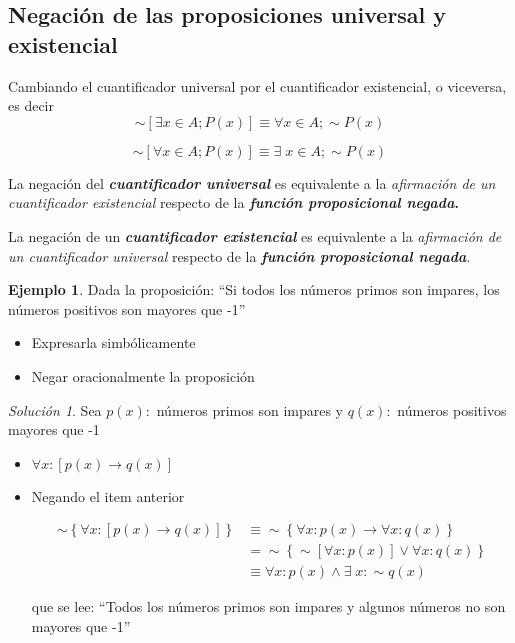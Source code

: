 \documentclass[
  16pt,
]{krantz}
\providecommand{\tightlist}{%
  \setlength{\itemsep}{0pt}\setlength{\parskip}{0pt}}
\theoremstyle{definition}
\theoremstyle{definition}
\newtheorem{example}{Ejemplo}[chapter]
\theoremstyle{definition}
\theoremstyle{definition}
\theoremstyle{remark}
\newtheorem*{solution}{Solución}
\begin{document}
\hypertarget{negaciuxf3n-de-las-proposiciones-universal-y-existencial}{%
\subsection{Negación de las proposiciones universal y existencial}\label{negaciuxf3n-de-las-proposiciones-universal-y-existencial}}

Cambiando el cuantificador universal por el cuantificador existencial, o viceversa, es decir \[\sim[\exists x\in A; P(x)]\equiv\forall x\in A;\sim P(x)\]

\[
\sim\left[\forall  x\in A; P(x)\right]\equiv\exists\; x\in A;\sim P(x)
\]

La negación del \textbf{\emph{cuantificador universal}} es equivalente a la \emph{afirmación de un cuantificador existencial} respecto de la \textbf{\emph{función proposicional negada}.}

La negación de un \textbf{\emph{cuantificador existencial}} es equivalente a la \emph{afirmación de un cuantificador universal} respecto de la \textbf{\emph{función proposicional negada}}.

\begin{example}
\protect\hypertarget{exm:unnamed-chunk-1}{}{\label{exm:unnamed-chunk-1} }Dada la proposición: ``Si todos los números primos son impa­res, los números positivos son mayores que -1''

\begin{itemize}
\tightlist
\item
  Expresarla simbólicamente
\item
  Negar oracionalmente la proposición
\end{itemize}
\end{example}

\begin{solution}
\iffalse{} {Solución. } \fi{}
Sea \(p(x):\) números primos son impares y \(q(x):\) números positivos mayores que -1

\begin{itemize}
\item
  \(\forall x:[p(x)\rightarrow q(x)]\)
\item
  Negando el item anterior

  \[
  \begin{aligned}
  \sim\left\{\forall x:[p(x)\rightarrow q(x)]\right\}
  &\equiv \sim\left\{\forall x:p(x)\rightarrow \forall x:q(x)\right\}\\
  &=\sim\left\{\sim[\forall x:p(x)]\vee \forall x:q(x)\right\}\\
  &\equiv\forall x:p(x)\wedge \exists\; x:\sim q(x)
  \end{aligned}
  \]

  que se lee: ``Todos los números primos son impares y algunos números no son mayores que -1''
\end{itemize}
\end{solution}
\end{document}
